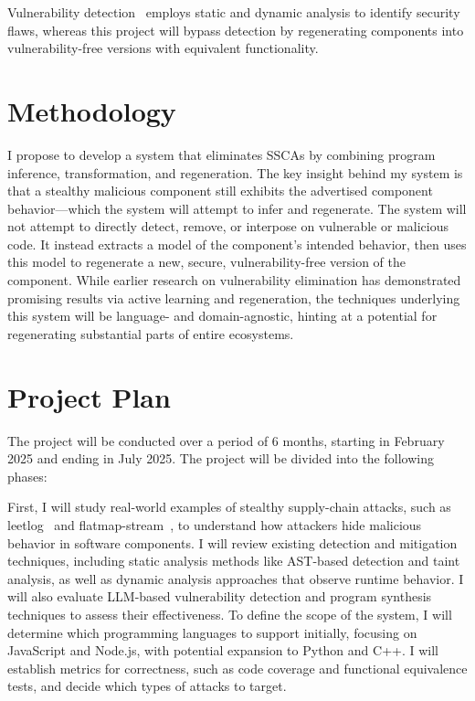 \documentclass[a4paper,twoside,11pt]{report} %
\begin{document}
Vulnerability detection~\cite{Calzavara2015, maffeis2009language} employs
static and dynamic analysis to identify security flaws, whereas this project will bypass
detection by regenerating components into vulnerability-free versions with
equivalent functionality.

\section*{Methodology}
I propose to develop a system that eliminates SSCAs by combining program
inference, transformation, and regeneration. The key insight behind my system
is that a stealthy malicious component still exhibits the advertised component
behavior—which the system will attempt to infer and regenerate. The system will
not attempt to directly detect, remove, or interpose on vulnerable or malicious
code. It instead extracts a model of the component’s intended behavior, then
uses this model to regenerate a new, secure, vulnerability-free version of the
component. While earlier research on vulnerability elimination has demonstrated
promising results via active learning and regeneration, the techniques
underlying this system will be language- and domain-agnostic, hinting at a
potential for regenerating substantial parts of entire ecosystems.

\section*{Project Plan}

The project will be conducted over a period of 6 months, starting in February 2025 and ending in July 2025. The project will be divided into the following phases:

First, I will study
real-world examples of stealthy supply-chain attacks, such as leetlog~\cite{leetlog-attack}
and
flatmap-stream~\cite{snyk-flatmapstream-2018, ev:eurosec:2022}, to understand how attackers hide malicious behavior in software
components. 
I will review existing detection and mitigation techniques,
including static analysis methods like AST-based detection and taint analysis,
as well as dynamic analysis approaches that observe runtime behavior.
I will
also evaluate LLM-based vulnerability detection and program synthesis
techniques to assess their effectiveness. To define the scope of the system, I
will determine which programming languages to support initially, focusing on
JavaScript and Node.js, with potential expansion to Python and C++.
I will
establish metrics for correctness, such as code coverage and functional
equivalence tests, and decide which types of attacks to target.
\end{document}
